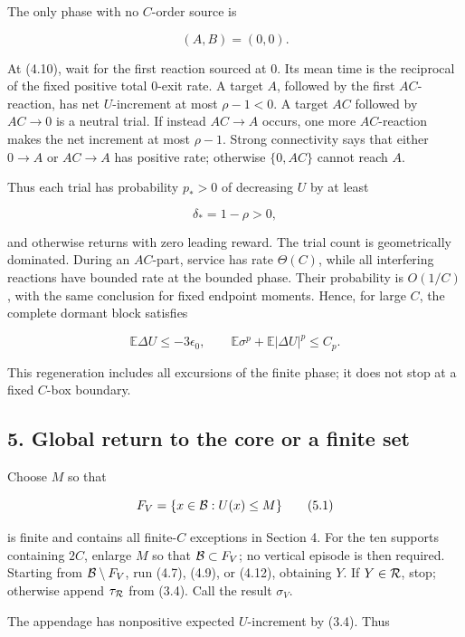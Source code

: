 The only phase with no \(C\)-order source is

\[
 (A,B)=(0,0).                                             \tag{4.10}
\]

At (4.10), wait for the first reaction sourced at \(0\). Its mean time
is the reciprocal of the fixed positive total \(0\)-exit rate. A target
\(A\), followed by the first \(AC\)-reaction, has net \(U\)-increment at
most \(\rho-1<0\). A target \(AC\) followed by \(AC\to0\) is a neutral
trial. If instead \(AC\to A\) occurs, one more \(AC\)-reaction makes the
net increment at most \(\rho-1\). Strong connectivity says that either
\(0\to A\) or \(AC\to A\) has positive rate; otherwise \(\{0,AC\}\)
cannot reach \(A\).

Thus each trial has probability \(p_*>0\) of decreasing \(U\) by at
least

\[
 \delta_*=1-\rho>0,                                      \tag{4.11}
\]

and otherwise returns with zero leading reward. The trial count is
geometrically dominated. During an \(AC\)-part, service has rate
\(\Theta(C)\), while all interfering reactions have bounded rate at the
bounded phase. Their probability is \(O(1/C)\), with the same conclusion
for fixed endpoint moments. Hence, for large \(C\), the complete dormant
block satisfies

\[
 \mathbb E\Delta U\le-3\epsilon_0,\qquad
 \mathbb E\sigma^p+\mathbb E|\Delta U|^p\le C_p.          \tag{4.12}
\]

This regeneration includes all excursions of the finite phase; it does
not stop at a fixed \(C\)-box boundary.

\subsection{5. Global return to the core or a finite
set}

Choose \(M\) so that

\[
 F_V=\{x\in{\cal B}:U(x)\le M\}                           \tag{5.1}
\]

is finite and contains all finite-\(C\) exceptions in Section 4. For the
ten supports containing \(2C\), enlarge \(M\) so that
\({\cal B}\subset F_V\); no vertical episode is then required. Starting
from \({\cal B}\mathbin{\backslash} F_V\), run (4.7), (4.9), or (4.12),
obtaining \(Y\). If \(Y\in{\cal R}\), stop; otherwise append
\(\tau_{\cal R}\) from (3.4). Call the result \(\sigma_V\).

The appendage has nonpositive expected \(U\)-increment by (3.4). Thus

